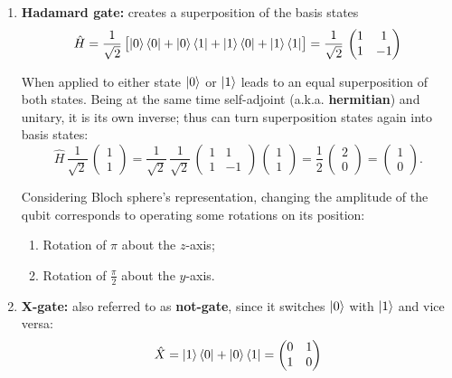 \begin{enumerate}
    \item \textbf{Hadamard gate:} creates a superposition of the basis states
    \begin{equation}\label{eqn:16-hadamard-gate}
    \hat{H} = \frac{1}{\sqrt{2}}\, 
    \bigl[
        \ket{0}\bra{0}+\ket{0}\bra{1}+\ket{1}\bra{0}+\ket{1}\bra{1}
    \bigr] = 
    \frac{1}{\sqrt{2}}\, 
    \begin{pmatrix}
        1 & 1\\ 1 &-1
    \end{pmatrix}
    \end{equation}

    When applied to either state $\ket{0}$ or $\ket{1}$ leads to an equal superposition of both states. Being at the same time self-adjoint (a.k.a. \textbf{hermitian}) and unitary, it is its own inverse; thus can turn superposition states again into basis states:
    \begin{equation}
    \hat{H}\, 
    \frac{1}{\sqrt{2}}\, 
    \begin{pmatrix}
        1\\1 
    \end{pmatrix} =  \frac{1}{\sqrt{2}}\,\frac{1}{\sqrt{2}}\, \begin{pmatrix}
        1 & 1\\ 1 &-1
    \end{pmatrix}\, \begin{pmatrix}
        1\\1 
    \end{pmatrix} = \frac{1}{2}\, \begin{pmatrix}
        2\\0
    \end{pmatrix} = \begin{pmatrix}
        1\\0
    \end{pmatrix}.
    \end{equation}

    Considering Bloch sphere's representation, changing the amplitude of the qubit corresponds to operating some rotations on its position:
    \begin{enumerate}
        \item Rotation of $\pi$ about the $z$-axis;
        \item Rotation of $\frac{\pi}{2}$ about the $y$-axis.
    \end{enumerate}

    \item \textbf{X-gate:} also referred to as \textbf{not-gate}, since it switches $\ket{0}$ with $\ket{1}$ and vice versa:
    \begin{equation}\label{eqn:16-x-gate}
    \hat{X} = 
    \ket{1}\bra{0}+\ket{0}\bra{1} = 
    \begin{pmatrix}
        0 &1\\1&0
    \end{pmatrix}
    \end{equation}


\end{enumerate}
